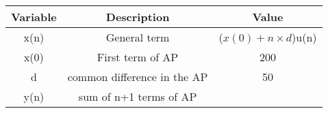 \begin{tabular}{|c|c|c|}
    \hline
    \textbf{Variable} & \textbf{Description} & \textbf{Value} \\
    \hline
    x(n) & General term & ($x(0)+n\times d$)u(n)\\
    \hline
    x(0) & First term of AP & 200\\
    \hline
    d & common difference in the AP & 50\\
    \hline
    y(n) & sum of n+1 terms of AP & \\
    \hline
\end{tabular}
